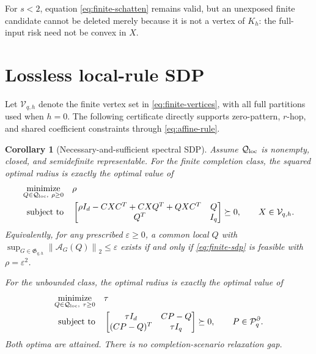 \documentclass[journal,10pt]{IEEEtran}
\newtheorem{corollary}[theorem]{Corollary}
\theoremstyle{definition}
\theoremstyle{remark}
\newcommand{\cP}{\mathcal P}
\newcommand{\cQ}{\mathcal Q}
\newcommand{\cA}{\mathcal A}
\newcommand{\fG}{\mathfrak G}
\newcommand{\norm}[1]{\left\lVert #1\right\rVert}
\begin{document}
For $s<2$, equation \eqref{eq:finite-schatten} remains valid, but an
unexposed finite candidate cannot be deleted merely because it is not a
vertex of $K_h$: the full-input risk need not be convex in $X$.

\section{Lossless local-rule SDP}

Let $\mathcal V_{q,h}$ denote the finite vertex set in
\eqref{eq:finite-vertices}, with all full partitions used when $h=0$.  The
following certificate directly supports zero-pattern, $r$-hop, and shared
coefficient constraints through \eqref{eq:affine-rule}.

\begin{corollary}[Necessary-and-sufficient spectral SDP]
\label{cor:sdp}
Assume $\cQ_{\rm loc}$ is nonempty, closed, and semidefinite representable.
For the finite completion class, the squared optimal radius is exactly the
optimal value of
\begin{equation}
\begin{aligned}
 \underset{Q\in\cQ_{\rm loc},\ \rho\geq0}{\operatorname{minimize}}
 &\quad \rho\\
 \text{subject to}
 &\quad
 \begin{bmatrix}
  \rho I_d-CXC^T+CXQ^T+QXC^T & Q\\
  Q^T&I_q
 \end{bmatrix}\succeq0,
 \qquad X\in\mathcal V_{q,h}.
\end{aligned}
\label{eq:finite-sdp}
\end{equation}
Equivalently, for any prescribed $\varepsilon\geq0$, a common local $Q$ with
$\sup_{G\in\fG_{q,h}}\norm{\cA_G(Q)}_2\leq\varepsilon$ exists if and only if
\eqref{eq:finite-sdp} is feasible with $\rho=\varepsilon^2$.

For the unbounded class, the optimal radius is exactly the optimal value of
\begin{equation}
\begin{aligned}
 \underset{Q\in\cQ_{\rm loc},\ \tau\geq0}{\operatorname{minimize}}
 &\quad \tau\\
 \text{subject to}
 &\quad
 \begin{bmatrix}
  \tau I_d&CP-Q\\
  (CP-Q)^T&\tau I_q
 \end{bmatrix}\succeq0,
 \qquad P\in\cP_q^\partial.
\end{aligned}
\label{eq:unbounded-sdp}
\end{equation}
Both optima are attained.  There is no completion-scenario relaxation gap.
\end{corollary}
\end{document}
